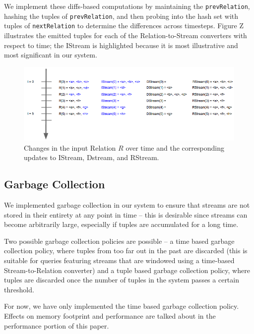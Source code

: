 \documentclass[a4paper, 10pt, conference]{IEEEconf}
\begin{document}
We implement these diffs-based computations by maintaining the \texttt{prevRelation}, hashing the tuples of \texttt{prevRelation}, and then probing into the hash set with tuples of \texttt{nextRelation} to determine the differences across timesteps. Figure Z illustrates the emitted tuples for each of the Relation-to-Stream converters with respect to time; the IStream is highlighted because it is most illustrative and most significant in our system. 

\begin{figure}[h!]
    \centering
    \centerline{\includegraphics[totalheight=3cm]{stream_converter.png}}
    \caption{Changes in the input Relation $R$ over time and the corresponding updates to IStream, Dstream, and RStream.}
    \label{fig:stream_converter}
\end{figure}


\subsection{Garbage Collection}

We implemented garbage collection in our system to ensure that streams are not stored in their entirety at any point in time -- this is desirable since streams can become arbitrarily large, especially if tuples are accumulated for a long time.

Two possible garbage collection policies are possible -- a time based garbage collection policy, where tuples from too far out in the past are discarded (this is suitable for queries featuring streams that are windowed using a time-based Stream-to-Relation converter) and a tuple based garbage collection policy, where tuples are discarded once the number of tuples in the system passes a certain threshold.

For now, we have only implemented the time based garbage collection policy. Effects on memory footprint and performance are talked about in the performance portion of this paper.


\end{document}
